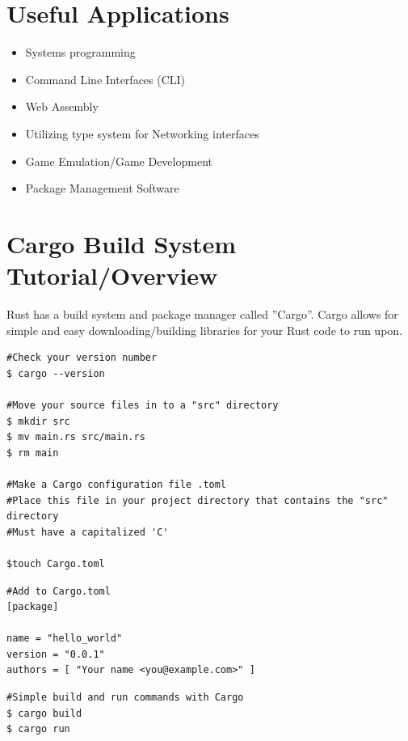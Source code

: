 \documentclass{article}
\begin{document}
\section*{Useful Applications\cite{info:rust}}

\begin{itemize}[noitemsep]
\item Systems programming
\item Command Line Interfaces (CLI)
\item Web Assembly
\item Utilizing type system for Networking interfaces
\item Game Emulation/Game Development
\item Package Management Software
\end{itemize}
\bigskip     %






\bigskip     %
\bigskip     %

\section*{Cargo Build System Tutorial/Overview\cite{code:rust}}
Rust has a build system and package manager called ''Cargo''. Cargo allows for simple and easy downloading/building libraries for your Rust code to run upon.
\begin{verbatim}
#Check your version number
$ cargo --version

#Move your source files in to a "src" directory
$ mkdir src
$ mv main.rs src/main.rs
$ rm main

#Make a Cargo configuration file .toml
#Place this file in your project directory that contains the "src" directory
#Must have a capitalized 'C'

$touch Cargo.toml
\end{verbatim}

\begin{verbatim}
#Add to Cargo.toml
[package]

name = "hello_world"
version = "0.0.1"
authors = [ "Your name <you@example.com>" ]

\end{verbatim}

\begin{verbatim}
#Simple build and run commands with Cargo
$ cargo build
$ cargo run
\end{verbatim}
\end{document}

